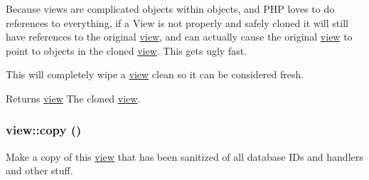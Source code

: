 Because views are complicated objects within objects, and PHP loves to do references to everything, if a View is not properly and safely cloned it will still have references to the original \hyperlink{classview}{view}, and can actually cause the original \hyperlink{classview}{view} to point to objects in the cloned \hyperlink{classview}{view}. This gets ugly fast.

This will completely wipe a \hyperlink{classview}{view} clean so it can be considered fresh.

\begin{DoxyReturn}{Returns}
\hyperlink{classview}{view} The cloned \hyperlink{classview}{view}. 
\end{DoxyReturn}
\hypertarget{classview_abc650102ccd583bd362f0e32fe091b99}{
\subsubsection[{copy}]{\setlength{\rightskip}{0pt plus 5cm}view::copy ()}}
\label{classview_abc650102ccd583bd362f0e32fe091b99}
Make a copy of this \hyperlink{classview}{view} that has been sanitized of all database IDs and handlers and other stuff.

